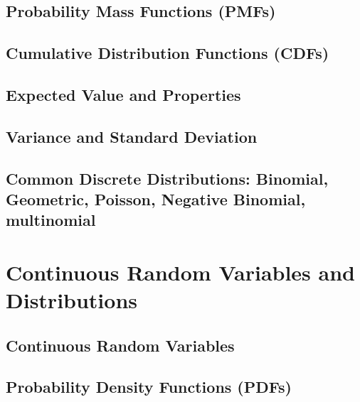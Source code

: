 \documentclass[
  12pt,
]{krantzNoCorner}
\begin{document}
\hypertarget{probability-mass-functions-pmfs}{%
\section{Probability Mass Functions (PMFs)}\label{probability-mass-functions-pmfs}}

\hypertarget{cumulative-distribution-functions-cdfs}{%
\section{Cumulative Distribution Functions (CDFs)}\label{cumulative-distribution-functions-cdfs}}

\hypertarget{expected-value-and-properties}{%
\section{Expected Value and Properties}\label{expected-value-and-properties}}

\hypertarget{variance-and-standard-deviation}{%
\section{Variance and Standard Deviation}\label{variance-and-standard-deviation}}

\hypertarget{common-discrete-distributions-binomial-geometric-poisson-negative-binomial-multinomial}{%
\section{Common Discrete Distributions: Binomial, Geometric, Poisson, Negative Binomial, multinomial}\label{common-discrete-distributions-binomial-geometric-poisson-negative-binomial-multinomial}}

\hypertarget{continuous-random-variables-and-distributions}{%
\chapter{Continuous Random Variables and Distributions}\label{continuous-random-variables-and-distributions}}

\hypertarget{continuous-random-variables}{%
\section{Continuous Random Variables}\label{continuous-random-variables}}

\hypertarget{probability-density-functions-pdfs}{%
\section{Probability Density Functions (PDFs)}\label{probability-density-functions-pdfs}}
\end{document}
